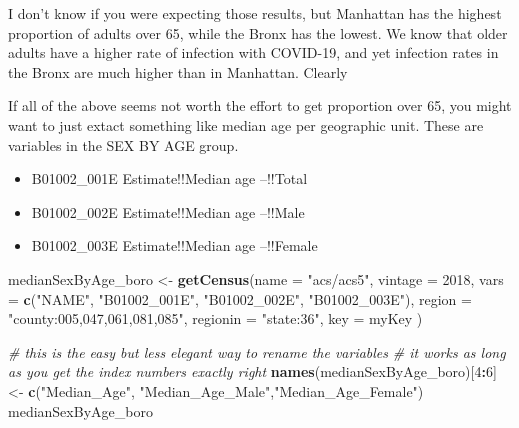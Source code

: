 \documentclass[openany]{book}
\newenvironment{Shaded}{\begin{snugshade}}{\end{snugshade}}
\newcommand{\CommentTok}[1]{\textcolor[rgb]{0.56,0.35,0.01}{\textit{#1}}}
\newcommand{\DataTypeTok}[1]{\textcolor[rgb]{0.13,0.29,0.53}{#1}}
\newcommand{\DecValTok}[1]{\textcolor[rgb]{0.00,0.00,0.81}{#1}}
\newcommand{\KeywordTok}[1]{\textcolor[rgb]{0.13,0.29,0.53}{\textbf{#1}}}
\newcommand{\NormalTok}[1]{#1}
\newcommand{\OperatorTok}[1]{\textcolor[rgb]{0.81,0.36,0.00}{\textbf{#1}}}
\newcommand{\StringTok}[1]{\textcolor[rgb]{0.31,0.60,0.02}{#1}}
\providecommand{\tightlist}{%
  \setlength{\itemsep}{0pt}\setlength{\parskip}{0pt}}
\begin{document}
I don't know if you were expecting those results, but Manhattan has the highest proportion of adults over 65, while the Bronx has the lowest. We know that older adults have a higher rate of infection with COVID-19, and yet infection rates in the Bronx are much higher than in Manhattan. Clearly

If all of the above seems not worth the effort to get proportion over 65, you might want to just extact something like median age per geographic unit. These are variables in the SEX BY AGE group.

\begin{itemize}
\tightlist
\item
  B01002\_001E Estimate!!Median age --!!Total
\item
  B01002\_002E Estimate!!Median age --!!Male
\item
  B01002\_003E Estimate!!Median age --!!Female
\end{itemize}

\begin{Shaded}
\begin{Highlighting}[]
\NormalTok{medianSexByAge_boro <-}\StringTok{ }\KeywordTok{getCensus}\NormalTok{(}\DataTypeTok{name =} \StringTok{"acs/acs5"}\NormalTok{,}
                                 \DataTypeTok{vintage =} \DecValTok{2018}\NormalTok{,}
                                 \DataTypeTok{vars =} \KeywordTok{c}\NormalTok{(}\StringTok{"NAME"}\NormalTok{, }
                                          \StringTok{"B01002_001E"}\NormalTok{, }\StringTok{"B01002_002E"}\NormalTok{, }\StringTok{"B01002_003E"}\NormalTok{),}
                                 \DataTypeTok{region =} \StringTok{"county:005,047,061,081,085"}\NormalTok{,}
                                 \DataTypeTok{regionin =} \StringTok{"state:36"}\NormalTok{, }
                                 \DataTypeTok{key =}\NormalTok{ myKey}
\NormalTok{                                 )}

\CommentTok{# this is the easy but less elegant way to rename the variables}
\CommentTok{# it works as long as you get the index numbers exactly right}
\KeywordTok{names}\NormalTok{(medianSexByAge_boro)[}\DecValTok{4}\OperatorTok{:}\DecValTok{6}\NormalTok{] <-}\StringTok{ }\KeywordTok{c}\NormalTok{(}\StringTok{"Median_Age"}\NormalTok{, }\StringTok{"Median_Age_Male"}\NormalTok{,}\StringTok{"Median_Age_Female"}\NormalTok{)}
\NormalTok{medianSexByAge_boro}
\end{Highlighting}
\end{Shaded}
\end{document}
